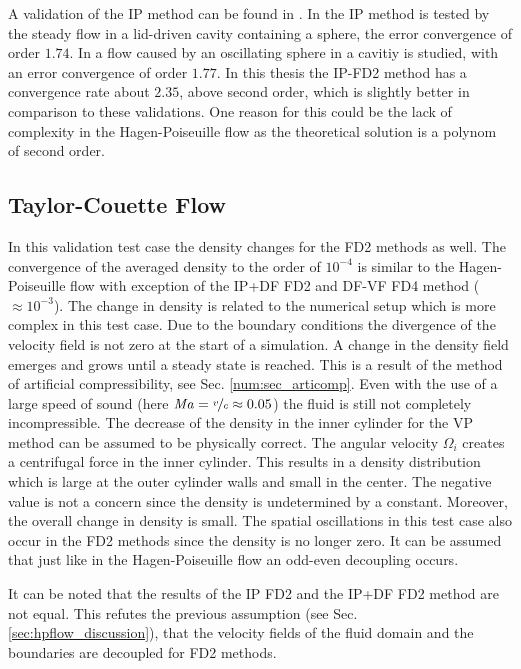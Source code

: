 A validation of the IP method can be found in \citep{Gilmanov2003, Gilmanov2005}.
In \citep{Gilmanov2003} the IP method is tested by the steady flow in a lid-driven cavity containing a sphere, the error convergence of order $1.74$.
In  \citep{Gilmanov2005} a flow caused by an oscillating sphere in a cavitiy is studied, with an error convergence of order $1.77$.
In this thesis the IP-FD2 method has a convergence rate about $2.35$, above second order, which is slightly better in comparison to these validations.
One reason for this could be the lack of complexity in the Hagen-Poiseuille flow as the theoretical solution is a polynom of second order.

\subsection{Taylor-Couette Flow}

In this validation test case the density changes for the FD2 methods as well.
The convergence of the averaged density to the order of $10^{-4}$
is similar to the Hagen-Poiseuille flow with exception of the IP+DF FD2 and DF-VF FD4 method ($\approx10^{-3}$).
The change in density is related to the numerical setup which is more complex in this test case.
Due to the boundary conditions the divergence of the velocity field is not zero at the start of a simulation.
A change in the density field emerges and grows until a steady state is reached.
This is a result of the method of artificial compressibility, see Sec. \ref{num:sec_articomp}.
Even with the use of a large speed of sound (here $\operatorname{\mathit{M\kern-.10em a}}=\nicefrac{v}{c}\approx0.05$)
the fluid is still not completely incompressible.
The decrease of the density in the inner cylinder for the VP method can be assumed to be physically correct.
The angular velocity $\Omega_i$ creates a centrifugal force in the inner cylinder.
This results in a density distribution which is large at the outer cylinder walls and small in the center.
The negative value is not a concern since the density is undetermined by a constant.
Moreover, the overall change in density is small.
The spatial oscillations in this test case also occur in the FD2 methods since the density is no longer zero.
It can be assumed that just like in the Hagen-Poiseuille flow an odd-even decoupling occurs.

It can be noted that the results of the IP FD2 and the IP+DF FD2 method are not equal.
This refutes the previous assumption (see Sec. \ref{sec:hpflow_discussion}),
that the velocity fields of the fluid domain and the boundaries are decoupled for FD2 methods.

